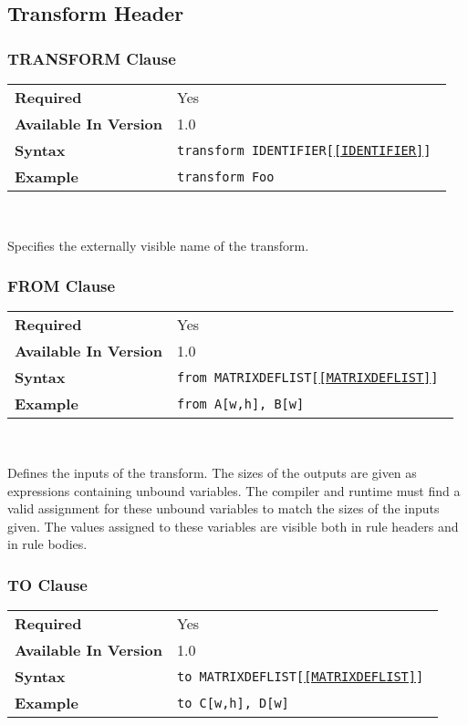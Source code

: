 \documentclass[11pt]{article}
\begin{document}
\subsection{Transform Header}
\label{sec:transform}

\subsubsection{TRANSFORM Clause}

\begin{tabular}{| l | l |}
\hline
\bf Required & Yes                    \\
\bf Available In Version & 1.0        \\
\bf Syntax & \tt transform IDENTIFIER[\ref{IDENTIFIER}] \\
\bf Example & \tt transform Foo       \\
\hline
\end{tabular}

~

\noindent
Specifies the externally visible name of the transform.

\subsubsection{FROM Clause}

\begin{tabular}{| l | l |}
\hline
\bf Required & Yes                    \\
\bf Available In Version & 1.0        \\
\bf Syntax & \tt from MATRIXDEFLIST[\ref{MATRIXDEFLIST}] \\
\bf Example & \tt from A[w,h], B[w]     \\
\hline
\end{tabular}

~

\noindent
\noindent Defines the inputs of the transform.  The sizes of the outputs
are given as expressions containing unbound variables.  The compiler and
runtime must find a valid assignment for these unbound variables to match
the sizes of the inputs given.  The values assigned to these variables are
visible both in rule headers and in rule bodies.


\subsubsection{TO Clause}

\begin{tabular}{| l | l |}
\hline
\bf Required & Yes                    \\
\bf Available In Version & 1.0        \\
\bf Syntax & \tt to MATRIXDEFLIST[\ref{MATRIXDEFLIST}]     \\
\bf Example & \tt to C[w,h], D[w]     \\
\hline
\end{tabular}
\end{document}
